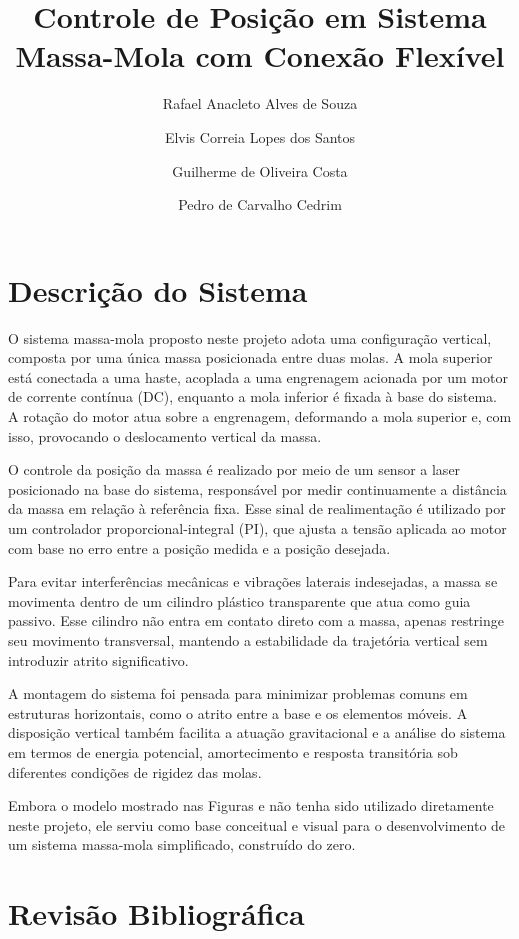 \documentclass[9pt,a4paper,twocolumn,twoside]{tau-class/tau}
\title{Controle de Posição em Sistema Massa-Mola com Conexão Flexível}
\author[a,1]{Rafael Anacleto Alves de Souza}
\author[a,2]{Elvis Correia Lopes dos Santos}
\author[a,3]{Guilherme de Oliveira Costa}
\author[a,4]{Pedro de Carvalho Cedrim}
\affil[a]{Instituto de Computação, Universidade Federal de Alagoas – Campus A.C. Simões\\
\textsuperscript{1}\texttt{raas@ic.ufal.br}, 
\textsuperscript{2}\texttt{ecls@ic.ufal.br}, 
\textsuperscript{3}\texttt{goc@ic.ufal.br},
\textsuperscript{4}\texttt{pcc@ic.ufal.br}}
\begin{document}
		
    \maketitle 
    \thispagestyle{firststyle} 
    \tauabstract
    

\section{Descrição do Sistema}

O sistema massa-mola proposto neste projeto adota uma configuração vertical, composta por uma única massa posicionada entre duas molas. A mola superior está conectada a uma haste, acoplada a uma engrenagem acionada por um motor de corrente contínua (DC), enquanto a mola inferior é fixada à base do sistema. A rotação do motor atua sobre a engrenagem, deformando a mola superior e, com isso, provocando o deslocamento vertical da massa.

O controle da posição da massa é realizado por meio de um sensor a laser posicionado na base do sistema, responsável por medir continuamente a distância da massa em relação à referência fixa. Esse sinal de realimentação é utilizado por um controlador proporcional-integral (PI), que ajusta a tensão aplicada ao motor com base no erro entre a posição medida e a posição desejada.

Para evitar interferências mecânicas e vibrações laterais indesejadas, a massa se movimenta dentro de um cilindro plástico transparente que atua como guia passivo. Esse cilindro não entra em contato direto com a massa, apenas restringe seu movimento transversal, mantendo a estabilidade da trajetória vertical sem introduzir atrito significativo.

A montagem do sistema foi pensada para minimizar problemas comuns em estruturas horizontais, como o atrito entre a base e os elementos móveis. A disposição vertical também facilita a atuação gravitacional e a análise do sistema em termos de energia potencial, amortecimento e resposta transitória sob diferentes condições de rigidez das molas.

Embora o modelo mostrado nas Figuras e não tenha sido utilizado diretamente neste projeto, ele serviu como base conceitual e visual para o desenvolvimento de um sistema massa-mola simplificado, construído do zero.

\section{Revisão Bibliográfica}
\end{document}
